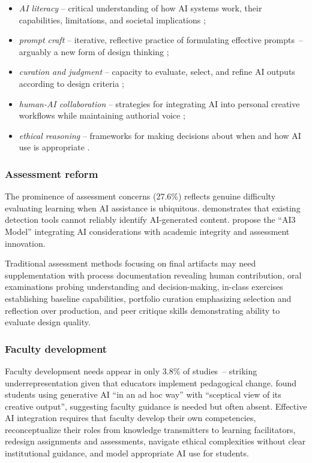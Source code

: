 \documentclass[ed]{acnsart}
\begin{document}
\begin{itemize}%
    \item \textit{AI literacy} -- critical understanding of how AI systems work, their capabilities, limitations, and societal implications \cite{Pudasaini2025};
    \item \textit{prompt craft} -- iterative, reflective practice of formulating effective prompts~-- arguably a new form of design thinking \cite{Lee2024};
    \item \textit{curation and judgment} -- capacity to evaluate, select, and refine AI outputs according to design criteria \cite{MedelVera2025};
    \item \textit{human-AI collaboration} -- strategies for integrating AI into personal creative workflows while maintaining authorial voice \cite{Turchi2023};
    \item \textit{ethical reasoning} -- frameworks for making decisions about when and how AI use is appropriate \cite{Buragohain2025}.
\end{itemize}

\subsubsection{Assessment reform}

The prominence of assessment concerns (27.6\%) reflects genuine difficulty evaluating learning when AI assistance is ubiquitous. \citet{Perkins2023} demonstrates that existing detection tools cannot reliably identify AI-generated content. \citet{Deluca2025} propose the ``AI3 Model'' integrating AI considerations with academic integrity and assessment innovation.

Traditional assessment methods focusing on final artifacts may need supplementation with process documentation revealing human contribution, oral examinations probing understanding and decision-making, in-class exercises establishing baseline capabilities, portfolio curation emphasizing selection and reflection over production, and peer critique skills demonstrating ability to evaluate design quality.

\subsubsection{Faculty development}

Faculty development needs appear in only 3.8\% of studies~-- striking underrepresentation given that educators implement pedagogical change. \citet{Fleischmann2024} found students using generative AI ``in an ad hoc way'' with ``sceptical view of its creative output'', suggesting faculty guidance is needed but often absent. Effective AI integration requires that faculty develop their own competencies, reconceptualize their roles from knowledge transmitters to learning facilitators, redesign assignments and assessments, navigate ethical complexities without clear institutional guidance, and model appropriate AI use for students.
\end{document}
